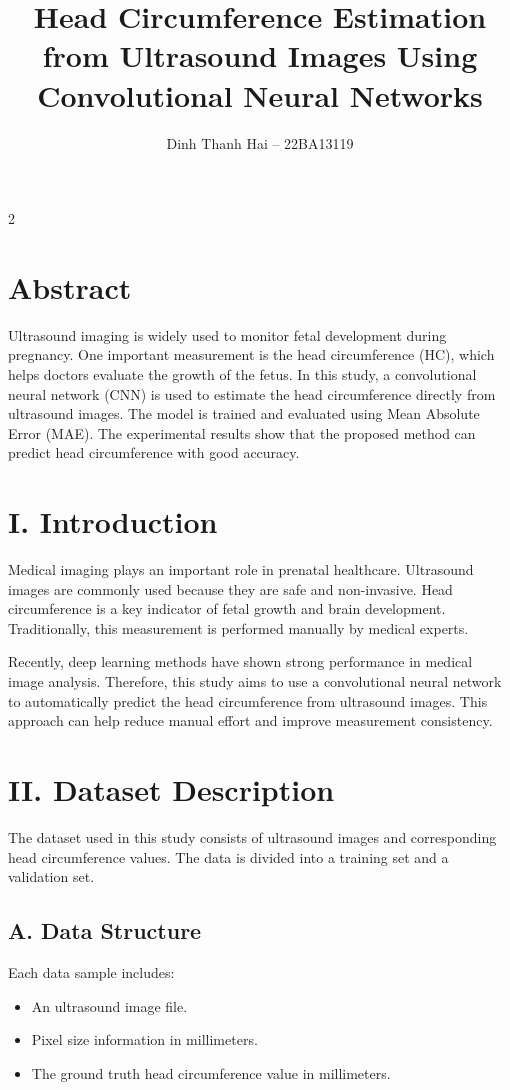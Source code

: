 \documentclass[10pt,a4paper]{article}
\title{\textbf{Head Circumference Estimation from Ultrasound Images Using Convolutional Neural Networks}}
\author{Dinh Thanh Hai -- 22BA13119}
\date{}
\begin{document}
\maketitle

\begin{multicols}{2}

\section*{Abstract}
Ultrasound imaging is widely used to monitor fetal development during pregnancy.
One important measurement is the head circumference (HC), which helps doctors
evaluate the growth of the fetus.
In this study, a convolutional neural network (CNN) is used to estimate the head
circumference directly from ultrasound images.
The model is trained and evaluated using Mean Absolute Error (MAE).
The experimental results show that the proposed method can predict head
circumference with good accuracy.

\section*{I. Introduction}
Medical imaging plays an important role in prenatal healthcare.
Ultrasound images are commonly used because they are safe and non-invasive.
Head circumference is a key indicator of fetal growth and brain development.
Traditionally, this measurement is performed manually by medical experts.

Recently, deep learning methods have shown strong performance in medical image
analysis.
Therefore, this study aims to use a convolutional neural network to automatically
predict the head circumference from ultrasound images.
This approach can help reduce manual effort and improve measurement consistency.

\section*{II. Dataset Description}
The dataset used in this study consists of ultrasound images and corresponding
head circumference values.
The data is divided into a training set and a validation set.

\subsection*{A. Data Structure}
Each data sample includes:
\begin{itemize}
    \item An ultrasound image file.
    \item Pixel size information in millimeters.
    \item The ground truth head circumference value in millimeters.
\end{itemize}


\end{multicols}
\end{document}
